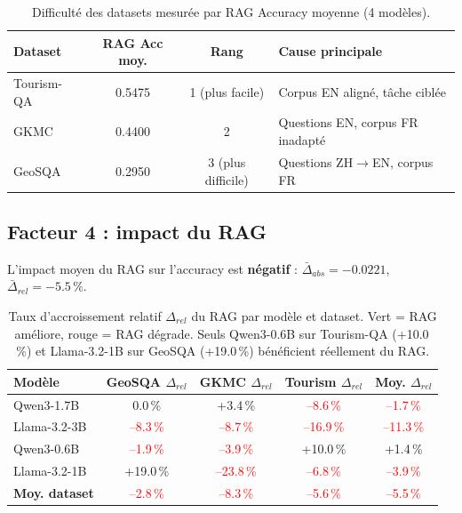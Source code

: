 \documentclass[12pt,a4paper]{article}
\begin{document}
\begin{table}[H]
\centering
\caption{Difficult\'e des datasets mesur\'ee par RAG Accuracy moyenne (4 mod\`eles).}
\label{tab:difficulte}
\begin{tabular}{@{} l c c l @{}}
\toprule
\textbf{Dataset} & \textbf{RAG Acc moy.} & \textbf{Rang} & \textbf{Cause principale} \\
\midrule
Tourism-QA & 0.5475 & 1 (plus facile) & Corpus EN align\'e, t\^ache cibl\'ee \\
\rowcolor{lightgray}
GKMC       & 0.4400 & 2
  & Questions EN, corpus FR inadapt\'e \\
GeoSQA     & 0.2950 & 3 (plus difficile)
  & Questions ZH$\to$EN, corpus FR \\
\bottomrule
\end{tabular}
\end{table}

\subsection{Facteur 4 : impact du RAG}
\label{sec:impact_rag}

L'impact moyen du RAG sur l'accuracy est \textbf{n\'egatif} :
$\bar{\Delta}_{abs} = -0.0221$, $\bar{\Delta}_{rel} = -5.5\,\%$.

\begin{table}[H]
\centering
\caption{Taux d'accroissement relatif $\Delta_{rel}$ du RAG par mod\`ele et dataset.
  Vert = RAG am\'eliore, rouge = RAG d\'egrade. Seuls Qwen3-0.6B sur Tourism-QA (+10.0\,\%)
  et Llama-3.2-1B sur GeoSQA (+19.0\,\%) b\'en\'eficient r\'eellement du RAG.}
\label{tab:rag_impact_relatif}
\begin{tabular}{@{} l c c c c @{}}
\toprule
\textbf{Mod\`ele}
  & \textbf{GeoSQA $\Delta_{rel}$}
  & \textbf{GKMC $\Delta_{rel}$}
  & \textbf{Tourism $\Delta_{rel}$}
  & \textbf{Moy. $\Delta_{rel}$} \\
\midrule
Qwen3-1.7B
  & \phantom{+}0.0\,\%
  & \textcolor{green!60!black}{+3.4\,\%}
  & \textcolor{red}{--8.6\,\%}
  & \textcolor{red}{--1.7\,\%} \\
\rowcolor{lightgray}
Llama-3.2-3B
  & \textcolor{red}{--8.3\,\%}
  & \textcolor{red}{--8.7\,\%}
  & \textcolor{red}{--16.9\,\%}
  & \textcolor{red}{--11.3\,\%} \\
Qwen3-0.6B
  & \textcolor{red}{--1.9\,\%}
  & \textcolor{red}{--3.9\,\%}
  & \textcolor{green!60!black}{+10.0\,\%}
  & \textcolor{green!60!black}{+1.4\,\%} \\
\rowcolor{lightgray}
Llama-3.2-1B
  & \textcolor{green!60!black}{+19.0\,\%}
  & \textcolor{red}{--23.8\,\%}
  & \textcolor{red}{--6.8\,\%}
  & \textcolor{red}{--3.9\,\%} \\
\midrule
\textbf{Moy. dataset}
  & \textcolor{red}{--2.8\,\%}
  & \textcolor{red}{--8.3\,\%}
  & \textcolor{red}{--5.6\,\%}
  & \textcolor{red}{--5.5\,\%} \\
\bottomrule
\end{tabular}
\end{table}
\end{document}
